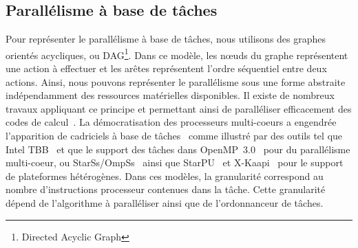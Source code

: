 \subsection{Parallélisme à base de tâches}
Pour représenter le parallélisme à base de tâches, nous utilisons des graphes orientés acycliques, ou DAG\footnote{Directed Acyclic Graph}.
%
Dans ce modèle, les n{\oe}uds du graphe représentent une action à effectuer et les arêtes représentent l'ordre séquentiel entre deux actions.
%
Ainsi, nous pouvons représenter le parallélisme sous une forme abstraite indépendamment des ressources matérielles disponibles.
%
Il existe de nombreux travaux appliquant ce principe et permettant ainsi de paralléliser efficacement des codes de calcul~\cite{BBAC2014,LSAT2013,LY2012,ABGL2013}.
%
La démocratisation des processeurs multi-coeurs a engendrée l'apparition de cadriciels à base de tâches~\cite{taskscomparison} comme illustré par des outils tel que Intel TBB~\cite{Intel_TBB} et que le support des tâches dans OpenMP~3.0~\cite{openmptasks} pour du parallélisme multi-coeur, ou StarSs/OmpSs~\cite{OMPSs} ainsi que StarPU~\cite{starpu} et X-Kaapi~\cite{xkaapi} pour le support de plateformes hétérogènes.
%
Dans ces modèles, la granularité correspond au nombre d'instructions processeur contenues dans la tâche.
%
Cette granularité dépend de l'algorithme à paralléliser ainsi que de l'ordonnanceur de tâches.
